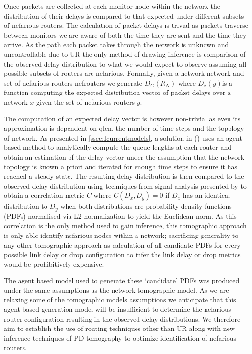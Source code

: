 Once packets are collected at each monitor node within the network the distribution of their delays is compared to that expected under different subsets of nefarious routers. The calculation of packet delays is trivial as packets traverse between monitors we are aware of both the time they are sent and the time they arrive. As the path each packet takes through the network is unknown and uncontrollable due to UR the only method of drawing inference is comparison of the observed delay distribution to what we would expect to observe assuming all possible subsets of routers are nefarious. Formally, given a network \gls{network} and set of nefarious routers \gls{nefrouters} we generate $D_G(R_N)$ where $D_x(y)$is a function computing the expected distribution vector of packet delays over a network $x$ given the set of nefarious routers $y$.\par
The computation of an expected delay vector is however non-trivial as even its approximation is dependent on \gls{qlen}, the number of time steps and the topology of \gls{network}. As presented in \cref{ssec:Icurrentmodels}, a solution in (\cite{barnes_stochastic_2020}) uses an agent based method to analytically compute the queue lengths at each router and obtain an estimation of the delay vector under the assumption that the network topology is known a priori and iterated for enough time steps to ensure it has reached a steady state. The resulting delay distribution is then compared to the observed delay distribution using techniques from signal analysis presented by \cite{lynn_introduction_2016} to obtain a correlation metric $C$ where $C(D_x,D_y)=0$ if $D_x$ has an identical distribution to $D_y$ when both distributions are probability density functions (PDFs) normalised via L2 normalization to yield the Euclidean norm. As this correlation is the only method used to gain inference, this tomographic approach is only able identify nefarious nodes within a network; sacrificing generality to any other tomographic approach as calculation of all candidate PDFs for every possible link delay or drop configuration to infer the link delay or drop metrics would be prohibitively expensive.\par
The agent based model used to generate these ‘candidate’ PDFs was produced under the same assumptions as the network tomographic model. As we are relaxing some of the tomographic models assumptions we anticipate that this agent based generation model will be insufficient to determine the nefarious router configuration resulting in the observed delay distributions. We therefore aim to establish the use of routing techniques other than UR along with new inference techniques of PD tomography to optimize identification of nefarious routers.


